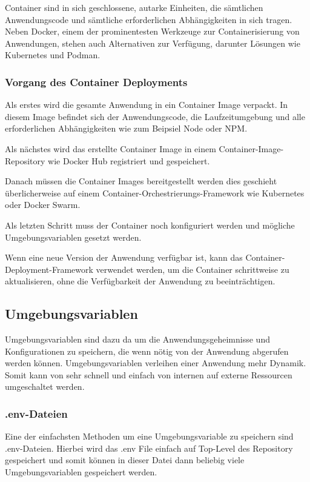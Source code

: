 Container sind in sich geschlossene, autarke Einheiten, die sämtlichen Anwendungscode und sämtliche erforderlichen Abhängigkeiten in sich tragen. Neben Docker, einem der prominentesten Werkzeuge zur Containerisierung von Anwendungen, stehen auch Alternativen zur Verfügung, darunter Lösungen wie Kubernetes und Podman.

\subsubsection{Vorgang des Container Deployments}

Als erstes wird die gesamte Anwendung in ein Container Image verpackt. In diesem Image befindet sich der Anwendungscode, die Laufzeitumgebung und alle erforderlichen Abhängigkeiten wie zum Beipsiel Node oder NPM.

Als nächstes wird das erstellte Container Image in einem Container-Image-Repository wie Docker Hub registriert und gespeichert.

Danach müssen die Container Images bereitgestellt werden dies geschieht überlicherweise auf einem Container-Orchestrierungs-Framework wie Kubernetes oder Docker Swarm.

Als letzten Schritt muss der Container noch konfiguriert werden und mögliche Umgebungsvariablen gesetzt werden.

Wenn eine neue Version der Anwendung verfügbar ist, kann das Container-Deployment-Framework verwendet werden, um die Container schrittweise zu aktualisieren, ohne die Verfügbarkeit der Anwendung zu beeinträchtigen.

\subsection{Umgebungsvariablen}

Umgebungsvariablen sind dazu da um die Anwendungsgeheimnisse und Konfigurationen zu speichern, die wenn nötig von der Anwendung abgerufen werden können. Umgebungsvariablen verleihen einer Anwendung mehr Dynamik. Somit kann von sehr schnell und einfach von internen auf externe Ressourcen umgeschaltet werden.

\subsubsection{.env-Dateien}

Eine der einfachsten Methoden um eine Umgebungsvariable zu speichern sind .env-Dateien. Hierbei wird das .env File einfach auf Top-Level des Repository gespeichert und somit können in dieser Datei dann beliebig viele Umgebungsvariablen gespeichert werden.

